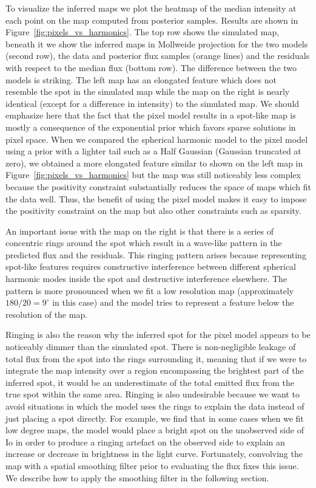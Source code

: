 \documentclass[modern]{aastex62}
\begin{document}
To visualize the inferred maps we plot the heatmap of the median intensity at each point on the map computed from posterior samples.
Results are shown in Figure~\ref{fig:pixels_vs_harmonics}.
The top row shows the simulated map, beneath it we show the inferred maps in Mollweide projection for the two models (second row), the data and posterior flux samples (orange lines) and the residuals with respect to the median flux (bottom row).
The difference between the two models is striking. 
The left map has an elongated feature which does not resemble the spot in the simulated map while the map on the right is nearly identical (except for a difference in intensity) to the simulated map. 
We should emphasize here that the fact that the pixel model results in a spot-like map is mostly a consequence of the exponential prior which favors sparse solutions in pixel space.
When we compared the spherical harmonic model to the pixel model using a prior with a lighter tail such as a Half Gaussian (Gaussian truncated at zero), we obtained a more elongated feature similar to shown on the left map in Figure~\ref{fig:pixels_vs_harmonics} but the map was still noticeably less complex because the positivity constraint substantially reduces the space of maps which fit the data well. 
Thus, the benefit of using the pixel model makes it easy to impose the positivity constraint on the map but also other constraints such as sparsity.

An important issue with the map on the right is that there is a series of concentric rings around the spot which result in a wave-like pattern in the predicted flux and the residuals.
This ringing pattern arises because representing spot-like features requires constructive interference between different spherical harmonic modes inside the spot and destructive interference elsewhere.
The pattern is more pronounced when we fit a low resolution map (approximately $180/20=9^\circ$ in this case) and the model tries to represent a feature below the resolution of the map.

Ringing is also the reason why the inferred spot for the pixel model appears to be noticeably dimmer than the simulated spot.
There is non-negligible leakage of total flux from the spot into the rings surrounding it, meaning that if we were to integrate the map intensity over a region encompassing the brightest part of the inferred spot, it would be an underestimate of the total emitted flux from the true spot within the same area.
Ringing is also undesirable because we want to avoid situations in which the model uses the rings to explain the data instead of just placing a spot directly. 
For example, we find that in some cases when we fit low degree maps, the model would place a bright spot on the unobserved side of Io in order to produce a ringing artefact on the observed side to explain an increase or decrease in brightness in the light curve. 
Fortunately, convolving the map with a spatial smoothing filter prior to evaluating the flux fixes this issue. 
We describe how to apply the smoothing filter in the following section.
\end{document}
